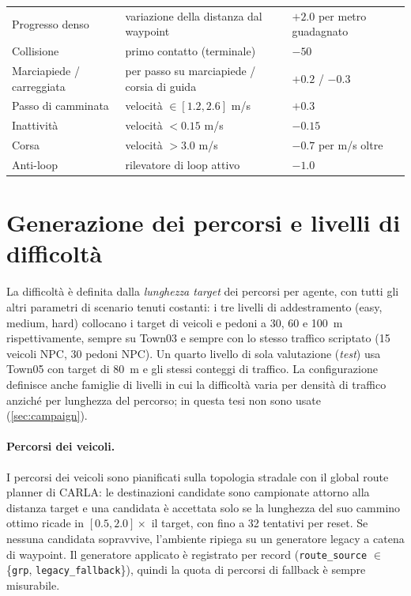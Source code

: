 \begin{table}[t]
\begin{tabular}{@{}p{3.4cm}p{5.6cm}p{4.6cm}@{}}
    Progresso denso       & variazione della distanza dal waypoint & $+2.0$ per metro guadagnato \\
    Collisione            & primo contatto (terminale) & $-50$ \\
    Marciapiede / carreggiata & per passo su marciapiede / corsia di guida & $+0.2$ / $-0.3$ \\
    Passo di camminata    & velocità $\in [1.2, 2.6]$ m/s & $+0.3$ \\
    Inattività            & velocità $< 0.15$ m/s & $-0.15$ \\
    Corsa                 & velocità $> 3.0$ m/s & $-0.7$ per m/s oltre \\
    Anti-loop             & rilevatore di loop attivo & $-1.0$ \\
    \bottomrule
  \end{tabular}
\end{table}

\section{Generazione dei percorsi e livelli di difficoltà}
\label{sec:routes}

La difficoltà è definita dalla \emph{lunghezza target} dei percorsi per
agente, con tutti gli altri parametri di scenario tenuti costanti: i tre
livelli di addestramento (easy, medium, hard) collocano i target di
veicoli e pedoni a 30, 60 e \SI{100}{m} rispettivamente, sempre su
Town03 e sempre con lo stesso traffico scriptato (15 veicoli NPC, 30
pedoni NPC). Un quarto livello di sola valutazione (\emph{test}) usa
Town05 con target di \SI{80}{m} e gli stessi conteggi di traffico. La
configurazione definisce anche famiglie di livelli in cui la difficoltà
varia per densità di traffico anziché per lunghezza del percorso; in
questa tesi non sono usate (\cref{sec:campaign}).

\paragraph{Percorsi dei veicoli.}
I percorsi dei veicoli sono pianificati sulla topologia stradale con il
global route planner di CARLA: le destinazioni candidate sono campionate
attorno alla distanza target e una candidata è accettata solo se la
lunghezza del suo cammino ottimo ricade in $[0.5, 2.0] \times$ il
target, con fino a 32 tentativi per reset. Se nessuna candidata
sopravvive, l'ambiente ripiega su un generatore legacy a catena di
waypoint. Il generatore applicato è registrato per record
(\texttt{route\_source} $\in$ \{\texttt{grp},
\texttt{legacy\_fallback}\}), quindi la quota di percorsi di fallback è
sempre misurabile.

